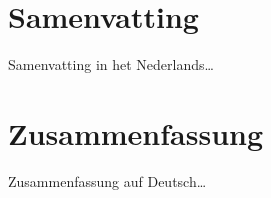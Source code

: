 \chapter*{Samenvatting}

{%
Samenvatting in het Nederlands\ldots
}

\afterpage{\pagecolor{none}}

\chapter*{Zusammenfassung}

{%
	Zusammenfassung auf Deutsch\ldots
}

\afterpage{\pagecolor{none}}
